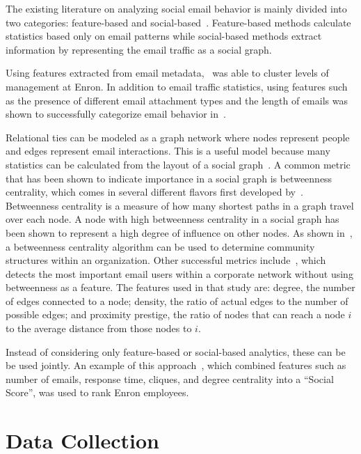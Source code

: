 \documentclass{article}
\begin{document}
The existing literature on analyzing social email behavior is mainly divided into two categories: feature-based and social-based~\cite{tang_email_2013}.  Feature-based methods calculate statistics based only on email patterns while social-based methods extract information by representing the email traffic as a social graph.

Using features extracted from email metadata,~\cite{yelupula_social_2008} was able to cluster levels of management at Enron. In addition to email traffic statistics, using features such as the presence of different email attachment types and the length of emails was shown to successfully categorize email behavior in~\cite{martin_analyzing_2005}.

Relational ties can be modeled as a graph network where nodes represent people and edges represent email interactions.  This is a useful model because many statistics can be calculated from the layout of a social graph~\cite{wasserman_social_1994}.  A common metric that has been shown to indicate importance in a social graph is betweenness centrality, which comes in several different flavors first developed by~\cite{freeman_set_1977}.  Betweenness centrality is a measure of how many shortest paths in a graph travel over each node.  A node with high betweenness centrality in a social graph has been shown to represent a high degree of influence on other nodes.  As shown in~\cite{tyler_email_2003}, a betweenness centrality algorithm can be used to determine community structures within an organization.  Other successful metrics include~\cite{wilson_discovery_2009}, which detects the most important email users within a corporate network without using betweenness as a feature.  The features used in that study are: degree, the number of edges connected to a node; density, the ratio of actual edges to the number of possible edges; and proximity prestige, the ratio of nodes that can reach a node $i$ to the average distance from those nodes to $i$.

Instead of considering only feature-based or social-based analytics, these can be be used jointly.  An example of this approach~\cite{rowe_automated_2007}, which combined features such as number of emails, response time, cliques, and degree centrality into a ``Social Score'', was used to rank Enron employees.  

\section{Data Collection} \label{Data Collection}
\end{document}

